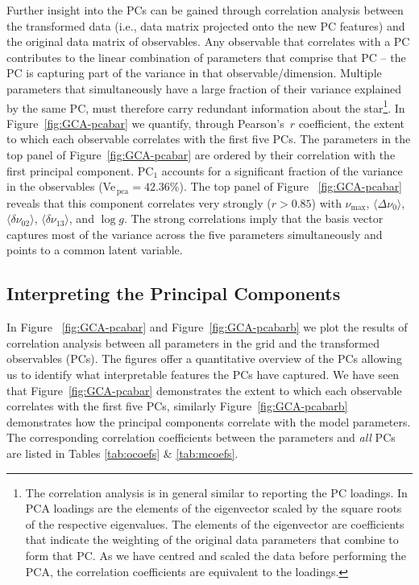 Further insight into the PCs can be gained through correlation analysis between the transformed data (i.e., data matrix projected onto the new PC features) and the original data matrix of observables.
Any observable that correlates with a PC contributes to the linear combination of parameters that comprise that PC -- the PC is capturing part of the variance in that observable/dimension. 
Multiple parameters that simultaneously have a large fraction of their variance explained by the same PC, must therefore carry redundant information about the star\footnote{The correlation analysis is in general similar to reporting the PC loadings. 
In PCA loadings are the elements of the eigenvector scaled by the square roots of the respective eigenvalues.
The elements of the eigenvector are coefficients that indicate the weighting of the original data parameters that combine to form that PC. 
As we have centred and scaled the data before performing the PCA, the correlation coefficients are equivalent to the loadings.}.
In Figure~\ref{fig:GCA-pcabar} we quantify, through Pearson's~$r$ coefficient, the extent to which each observable correlates with the first five PCs.
The parameters in the top panel of Figure~\ref{fig:GCA-pcabar} are ordered by their correlation with the first principal component. 
PC$_1$ accounts for a significant fraction of the variance in the observables (Ve${_{\, \text{pca}}=42.36\%}$). 
The top panel of  Figure~ \ref{fig:GCA-pcabar} reveals that this component correlates very strongly 
(${r > 0.85}$)  with   
$\nu_{\max}$, 
${\langle\Delta\nu_0\rangle}$,
${\langle\delta\nu_{02}\rangle}$, 
${\langle\delta\nu_{13}\rangle}$,
and ${\log{} g}$.  
The strong correlations imply that the basis vector captures most of the variance across the five parameters simultaneously and points to a common latent variable. 


\subsection{Interpreting the Principal Components}
\label{sec:intPC}


In Figure~ \ref{fig:GCA-pcabar} and Figure~\ref{fig:GCA-pcabarb} we plot the results of correlation analysis between all parameters in the grid and the transformed observables (PCs). 
The figures offer a quantitative overview of the PCs allowing  us to identify what interpretable features the PCs have captured.
We have seen that Figure~\ref{fig:GCA-pcabar} demonstrates the extent to which each observable correlates with the first five PCs, similarly  Figure~\ref{fig:GCA-pcabarb} demonstrates how the principal components correlate with the model parameters. The corresponding correlation coefficients between the parameters and \emph{all} PCs are listed in Tables \ref{tab:ocoefs} \& \ref{tab:mcoefs}.

